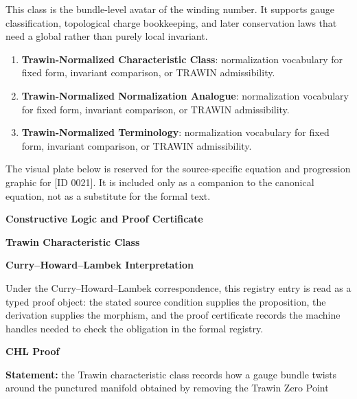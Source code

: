 This class is the bundle-level avatar of the winding number. It supports gauge classification, topological charge bookkeeping, and later conservation laws that need a global rather than purely local invariant.
\endgroup

\begingroup\footnotesize\sloppy
\begin{enumerate}[leftmargin=1.35em,itemsep=1pt,topsep=1pt,parsep=0pt]
\item \textbf{Trawin-Normalized Characteristic Class}: normalization vocabulary for fixed form, invariant comparison, or TRAWIN admissibility.
\item \textbf{Trawin-Normalized Normalization Analogue}: normalization vocabulary for fixed form, invariant comparison, or TRAWIN admissibility.
\item \textbf{Trawin-Normalized Terminology}: normalization vocabulary for fixed form, invariant comparison, or TRAWIN admissibility.
\end{enumerate}
\endgroup

\begingroup\footnotesize\sloppy
The visual plate below is reserved for the source-specific equation and progression graphic for [ID 0021]. It is included only as a companion to the canonical equation, not as a substitute for the formal text.
\par\endgroup
\ifTZPDarkEdition
{}
\fi

\clearpage
\begingroup\tzpsupportsetup
\noindent\textbf{\fontsize{10.8pt}{12.8pt}\selectfont [ID 0021] Constructive Logic and Proof Certificate}\par
\noindent\textbf{\fontsize{10pt}{12pt}\selectfont Trawin Characteristic Class}\par
\vspace{0.45em}
\begingroup
\footnotesize
\setlength{\parskip}{0.22em}
\setlength{\parindent}{0pt}
\noindent\textbf{Curry--Howard--Lambek Interpretation}\par
Under the Curry--Howard--Lambek correspondence, this registry entry is read as a typed proof
object: the stated source condition supplies the proposition, the derivation supplies the
morphism, and the proof certificate records the machine handles needed to check the obligation
in the formal registry.

\vspace{0.45em}
\noindent\textbf{CHL Proof}\par
\textbf{Statement:} the Trawin characteristic class records how a gauge bundle twists around the punctured
manifold obtained by removing the Trawin Zero Point

